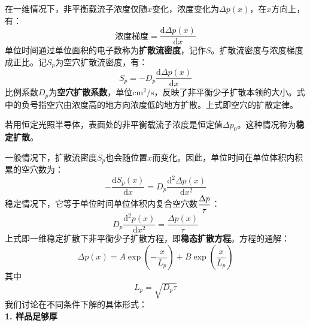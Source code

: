 在一维情况下，非平衡载流子浓度仅随$x$变化，浓度变化为$\Delta p(x)$，在$x$方向上，有：
\begin{equation}
    \text{浓度梯度}=\frac{\mathrm{d}\Delta p(x)}{\mathrm{d}x}
\end{equation}
单位时间通过单位面积的电子数称为\textbf{扩散流密度}，记作$S$。扩散流密度与浓度梯度成正比。记$S_p$为空穴扩散流密度，有：
\begin{equation}
    S_p=-D_p\frac{\mathrm{d}\Delta p(x)}{\mathrm{d}x}\label{eq:chap-5-uneqilibrium-hole-diffusion-law}
\end{equation}
比例系数$D_p$为\textbf{空穴扩散系数}，单位$\mathrm{cm^2/s}$，反映了非平衡少子扩散本领的大小。式中的负号指空穴由浓度高的地方向浓度低的地方扩散。上式即空穴的扩散定律。

若用恒定光照半导体，表面处的非平衡载流子浓度是恒定值$\Delta p_0$。这种情况称为\textbf{稳定扩散}。

一般情况下，扩散流密度$S_p$也会随位置$x$而变化。因此，单位时间在单位体积内积累的空穴数为：
\begin{equation}
    -\frac{\mathrm{d}S_p(x)}{\mathrm{d}x}=D_p\frac{\mathrm{d^2}\Delta p(x)}{\mathrm{d}x^2}
\end{equation}
稳定情况下，它等于单位时间单位体积内复合空穴数$\displaystyle\frac{\Delta p}{\tau}$：
\begin{equation}
    D_p\frac{\mathrm{d}^2p(x)}{\mathrm{d}x^2}=\frac{\Delta p(x)}{\tau}
\end{equation}
上式即一维稳定扩散下非平衡少子扩散方程，即\textbf{稳态扩散方程}。方程的通解：
\begin{equation}
    \Delta p(x)=A\exp{\left(-\frac{x}{L_p}\right)}+B\exp{\left(\frac{x}{L_p}\right)}
\end{equation}
其中
\begin{equation}
    L_p=\sqrt{D_p\tau}
\end{equation}
我们讨论在不同条件下解的具体形式：\vspace{1ex}\\
\textbf{1. 样品足够厚}

